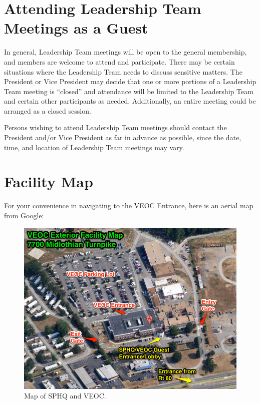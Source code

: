 \documentclass[pdflatex,letterpaper,twoside,12pt]{book}
\begin{document}
\section {Attending Leadership Team Meetings as a Guest}

In general, Leadership Team meetings will be open to the general membership, and members are welcome to attend and participate.  There may be certain situations where the Leadership Team needs to discuss sensitive matters.  The President or Vice President may decide that one or more portions of a Leadership Team meeting is ``closed'' and attendance will be limited to the Leadership Team and certain other participants as needed.  Additionally, an entire meeting could be arranged as a closed session.

Persons wishing to attend Leadership Team meetings should contact the President and/or Vice President as far in advance as possible, since the date, time, and location of Leadership Team meetings may vary.



\section{Facility Map}

For your convenience in navigating to the VEOC Entrance, here is an aerial map from Google:

\begin{figure}[h!]
  \centering
  \includegraphics[width=\textwidth,keepaspectratio=true]{resources/veoc_map}
  \caption{Map of SPHQ and VEOC.\label{fig:ops-main-screen}}
\end{figure}
\end{document}
